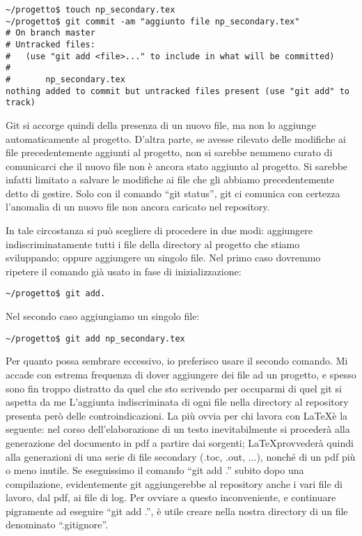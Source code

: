 \documentclass[a4paper,12pt,oneside]{article}
\begin{document}
\begin{lstlisting}
~/progetto$ touch np_secondary.tex
~/progetto$ git commit -am "aggiunto file np_secondary.tex"
# On branch master
# Untracked files:
#   (use "git add <file>..." to include in what will be committed)
#
#       np_secondary.tex
nothing added to commit but untracked files present (use "git add" to track)
\end{lstlisting}

Git si accorge quindi della presenza di un nuovo file, ma non lo aggiunge
automaticamente al progetto. D'altra parte, se avesse rilevato delle modifiche
ai file precedentemente aggiunti al progetto, non si sarebbe nemmeno curato di
comunicarci che il nuovo file non è ancora stato aggiunto al progetto. Si
sarebbe infatti limitato a salvare le modifiche ai file che gli abbiamo
precedentemente detto di gestire. Solo con il comando ``git status'', git ci
comunica con certezza l'anomalia di un nuovo file non ancora caricato nel
repository.

In tale circostanza si può scegliere di procedere in due modi:
aggiungere indiscriminatamente tutti i file della directory al progetto che
stiamo sviluppando; oppure aggiungere un singolo file. Nel primo caso dovremmo
ripetere il comando già usato in fase di inizializzazione:

\begin{lstlisting}
~/progetto$ git add.
\end{lstlisting}

Nel secondo caso aggiungiamo un singolo file:

\begin{lstlisting}
~/progetto$ git add np_secondary.tex
\end{lstlisting}

Per quanto possa sembrare eccessivo, io preferisco usare il secondo comando.
Mi accade con estrema frequenza di
dover aggiungere dei file ad un progetto, e spesso sono fin troppo
distratto da quel che sto scrivendo per occuparmi di quel git si aspetta da me
L'aggiunta indiscriminata di ogni file nella directory al repository presenta
però delle controindicazioni.
La più ovvia per chi lavora con \LaTeX è la seguente:
nel corso dell'elaborazione di un testo inevitabilmente si
procederà alla generazione del documento in pdf a partire dai sorgenti;
\LaTeX provvederà quindi alla generazioni di una serie di file secondary (.toc,
.out, ...), nonché di un pdf più o meno inutile.
Se eseguissimo il comando ``git add .'' subito dopo una compilazione,
evidentemente git aggiungerebbe al repository anche i vari file di lavoro, dal
pdf, ai file  di log. Per ovviare a questo inconveniente, e continuare
pigramente ad eseguire ``git add .'', è utile creare nella nostra directory di
un file denominato ``.gitignore''.
\end{document}
